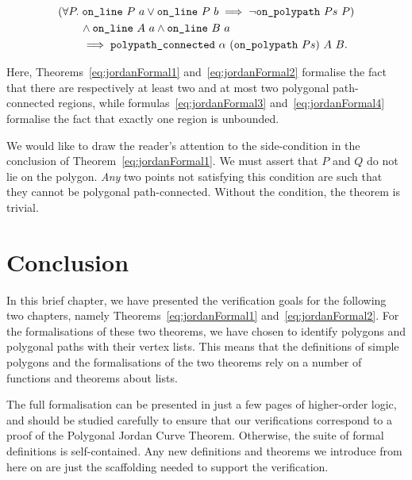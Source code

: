 \begin{equation}\label{eq:jordanFormal4}
  \begin{split}
    &(\forall P.\;\code{on\_line}\ P\ a \vee \code{on\_line}\ P\ b\implies \neg\code{on\_polypath}\ Ps\ P)\\
    &\qquad\wedge\code{on\_line}\ A\ a \wedge\code{on\_line}\ B\ a\\
    &\qquad\implies \code{polypath\_connected}\ \alpha\ (\code{on\_polypath}\ Ps)\ A\ B.
  \end{split}
\end{equation}

Here, Theorems~\ref{eq:jordanFormal1} and~\ref{eq:jordanFormal2} formalise the fact that there are respectively at least two and at most two polygonal path-connected regions, while formulas~\ref{eq:jordanFormal3} and~\ref{eq:jordanFormal4} formalise the fact that exactly one region is unbounded.

We would like to draw the reader's attention to the side-condition in the conclusion of Theorem~\ref{eq:jordanFormal1}. We must assert that $P$ and $Q$ do not lie on the polygon. \emph{Any} two points not satisfying this condition are such that they cannot be polygonal path-connected. Without the condition, the theorem is trivial.

\section{Conclusion}
In this brief chapter, we have presented the verification goals for the following two chapters, namely Theorems~\ref{eq:jordanFormal1} and~\ref{eq:jordanFormal2}. For the formalisations of these two theorems, we have chosen to identify polygons and polygonal paths with their vertex lists. This means that the definitions of simple polygons and the formalisations of the two theorems rely on a number of functions and theorems about lists.

The full formalisation can be presented in just a few pages of higher-order logic, and should be studied carefully to ensure that our verifications correspond to a proof of the Polygonal Jordan Curve Theorem. Otherwise, the suite of formal definitions is self-contained. Any new definitions and theorems we introduce from here on are just the scaffolding needed to support the verification.

